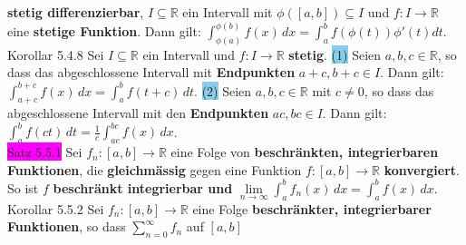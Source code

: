 \documentclass[landscape, 10pt]{article}
\newcommand{\R}{\mathbb{R}}
\begin{document}
\begin{multicols}{3}
                     \textbf{stetig differenzierbar}, 
                     \textcolor{NavyBlue}{$I\subseteq\R$}
                     ein Intervall mit 
                     \textcolor{NavyBlue}{$\phi([a,b])\subseteq I$}
                     und \textcolor{NavyBlue}{$f:I\longrightarrow\R$} eine 
                     \textbf{stetige Funktion}. Dann gilt: 
                     \textcolor{NavyBlue}{$\int_{\phi(a)}^{\phi(b)}f(x)\,dx
                     =\int_a^bf(\phi(t))\phi'(t)dt$}.\\
              \colorbox{BurntOrange}{Korollar 5.4.8} 
                     Sei \textcolor{NavyBlue}{$I\subseteq\R$}
                     ein Intervall und \textcolor{NavyBlue}{$f:I\longrightarrow\R$} 
                     \textbf{stetig}. 
                     \colorbox{SkyBlue}{(1)} Seien \textcolor{NavyBlue}{$a,b,c\in\R$}, 
                     so dass das abgeschlossene Intervall 
                     mit \textbf{Endpunkten} \textcolor{NavyBlue}{$a+c,b+c\in I$}. 
                     Dann gilt: 
                     \textcolor{NavyBlue}{$\int_{a+c}^{b+c}f(x)\,dx=\int_a^bf(t+c)\,dt$}.
                     \colorbox{SkyBlue}{(2)} Seien \textcolor{NavyBlue}{$a,b,c\in\R$} mit 
                     \textcolor{NavyBlue}{$c\neq0$}, so dass das abgeschlossene Intervall mit den 
                     \textbf{Endpunkten} \textcolor{NavyBlue}{$ac,bc\in I$}. 
                     Dann gilt: \textcolor{NavyBlue}{
                     $\int_a^bf(ct)\,dt=\frac{1}{c}\int_{ac}^{bc}f(x)\,dx$}.\\
              \colorbox{magenta}{Satz 5.5.1} 
                     Sei \textcolor{NavyBlue}{$f_n:[a,b]\longrightarrow\R$} 
                     eine Folge von \textbf{beschränkten, integrierbaren Funktionen}, 
                     die \textbf{gleichmässig} gegen 
                     eine Funktion 
                     \textcolor{NavyBlue}{$f:[a,b]\longrightarrow\R$} 
                     \textbf{konvergiert}.
                     So ist \textcolor{NavyBlue}{$f$} 
                     \textbf{beschränkt integrierbar und} 
                     \textcolor{NavyBlue}{
                     $\lim\limits_{n\to\infty}\int_a^bf_n(x)\,dx =\int_a^bf(x)\,dx$}.\\
              \colorbox{BurntOrange}{Korollar 5.5.2} Sei 
                     \textcolor{NavyBlue}{$f_n:[a,b]\longrightarrow\R$} eine Folge 
                     \textbf{beschränkter, integrierbarer Funktionen}, so dass 
                     \textcolor{NavyBlue}{$\sum_{n=0}^\infty f_n$} auf 
                     \textcolor{NavyBlue}{$[a,b]$}

\end{multicols}
\end{document}
